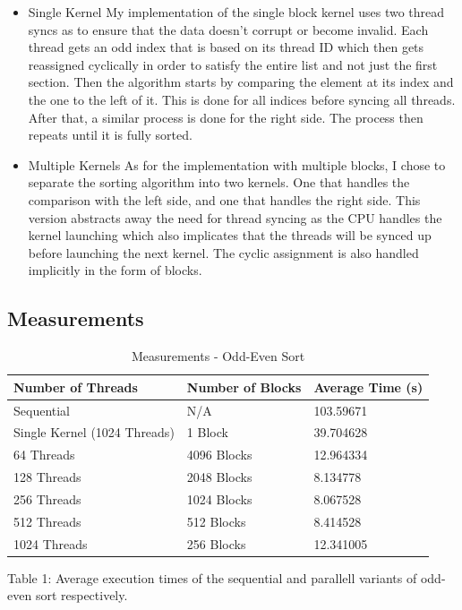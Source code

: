 \documentclass[a4]{article}
\begin{document}
\begin{itemize}
	\item Single Kernel
	\subitem{\textbf{-}} My implementation of the single block kernel uses two thread syncs as to ensure that the data doesn't corrupt or become
	invalid. Each thread gets an odd index that is based on its thread ID which then gets reassigned cyclically in order to satisfy the entire list
	and not just the first section. Then the algorithm starts by comparing the element at its index and the one to the left of it. This is done for
	all indices before syncing all threads. After that, a similar process is done for the right side. The process then repeats until it is fully sorted.

	\item Multiple Kernels
	\subitem{\textbf{-}} As for the implementation with multiple blocks, I chose to separate the sorting algorithm into two kernels. One that handles the
	comparison with the left side, and one that handles the right side. This version abstracts away the need for thread syncing as the CPU handles the kernel
	launching which also implicates that the threads will be synced up before launching the next kernel. The cyclic assignment is also handled implicitly 
	in the form of blocks.
\end{itemize}

\subsection{Measurements}

\begin{table}[H]
	\caption{Measurements - Odd-Even Sort}
	\begin{center}
		\begin{tabular}{ | m{14em} | m{8em} | m{8em} |} 
			\hline
			Number of Threads & Number of Blocks & Average Time (s) \\
			\hline
			\hline
			Sequential & N/A & 103.59671 \\
			\hline
			\hline
			Single Kernel (1024 Threads) & 1 Block & 39.704628 \\
			\hline
			\hline
			64 Threads & 4096 Blocks & 12.964334 \\
			128 Threads & 2048 Blocks & 8.134778 \\
			256 Threads & 1024 Blocks & 8.067528 \\
			512 Threads & 512 Blocks & 8.414528 \\
			1024 Threads & 256 Blocks & 12.341005 \\
			\hline
			
		\end{tabular}
	\end{center}
	\begin{tablenotes}
		\small
		\item Table 1: Average execution times of the sequential and parallell variants of odd-even sort respectively. 
	\end{tablenotes}
\end{table}
\end{document}
